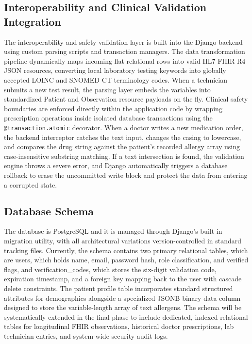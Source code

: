 \documentclass[12pt, a4paper]{report}
\numberwithin{equation}{chapter}
\begin{document}
\subsection{Interoperability and Clinical Validation Integration}
The interoperability and safety validation layer is built into the Django backend using custom parsing scripts and transaction managers. The data transformation pipeline dynamically maps incoming flat relational rows into valid HL7 FHIR R4 JSON resources, converting local laboratory testing keywords into globally accepted LOINC and SNOMED CT terminology codes. When a technician submits a new test result, the parsing layer embeds the variables into standardized Patient and Observation resource payloads on the fly. Clinical safety boundaries are enforced directly within the application code by wrapping prescription operations inside isolated database transactions using the \texttt{@transaction.atomic} decorator. When a doctor writes a new medication order, the backend interceptor catches the text input, changes the casing to lowercase, and compares the drug string against the patient's recorded allergy array using case-insensitive substring matching. If a text intersection is found, the validation engine throws a severe error, and Django automatically triggers a database rollback to erase the uncommitted write block and protect the data from entering a corrupted state.

\subsection{Database Schema}
The database is PostgreSQL and it is managed through Django's built-in migration utility, with all architectural variations version-controlled in standard tracking files. Currently, the schema contains two primary relational tables, which are users, which holds name, email, password hash, role classification, and verified flags, and verification\_codes, which stores the six-digit validation code, expiration timestamp, and a foreign key mapping back to the user with cascade delete constraints. The patient profile table incorporates standard structured attributes for demographics alongside a specialized JSONB binary data column designed to store the variable-length array of text allergens. The schema will be systematically extended in the final phase to include dedicated, indexed relational tables for longitudinal FHIR observations, historical doctor prescriptions, lab technician entries, and system-wide security audit logs.
\end{document}
